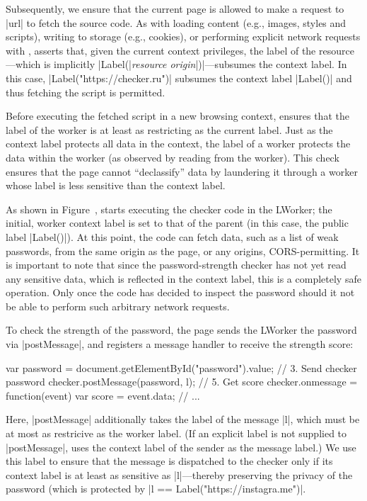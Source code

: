 Subsequently, we ensure that the current page is allowed to make a
request to \js|url| to fetch the source code.
%
As with loading content (e.g., images, styles and scripts), writing to
storage (e.g., cookies), or performing explicit network requests with
\xhr{}, \sys{} asserts that, given the current context privileges, the
label of the resource---which is implicitly \js|Label(|\emph{resource
origin}\js|)|---subsumes the context label.
%
In this case, \js|Label("https://checker.ru")| subsumes the context
label \js|Label()| and thus fetching the script is permitted.

Before executing the fetched script in a new browsing context, \sys{}
ensures that the label of the worker is at least as restricting as the
current label.
%
Just as the context label protects all data in the context, the label
of a worker protects the data within the worker (as observed by
reading from the worker).
%
This check ensures that the page cannot ``declassify'' data by
laundering it through a worker whose label is less sensitive than the
context label.

As shown in Figure~, \sys{} starts executing the
checker code in the LWorker; the initial, worker context label is set
to that of the parent (in this case, the public label \js|Label()|).
%
At this point, the code can fetch data, such as a list of weak
passwords, from the same origin as the page, or any origins,
CORS-permitting.
%
It is important to note that since the password-strength checker has
not yet read any sensitive data, which is reflected in the context
label, this is a completely safe operation.
%
Only once the code has decided to inspect the password should it not
be able to perform such arbitrary network requests.

To check the strength of the password, the page sends the LWorker the
password via \js|postMessage|, and registers a message handler to
receive the strength score:
\begin{jscode}
var password = 
 document.getElementById("password").value;
// 3. Send checker password 
checker.postMessage(password, l);
// 5. Get score
checker.onmessage = function(event) {
  var score = event.data; 
  // ...
}
\end{jscode}
Here, \js|postMessage| additionally takes the label of the message
\js|l|, which must be at most as restricive as the worker label.
%
(If an explicit label is not supplied to \js|postMessage|, \sys{}
uses the context label of the sender as the message label.)
%
We use this label to ensure that the message is dispatched to the
checker only if its context label is at least as sensitive as
\js|l|---thereby preserving the privacy of the password (which is
protected by \js|l == Label("https://instagra.me")|.

